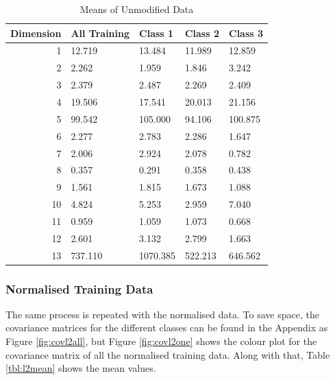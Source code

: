 \documentclass[a4paper, 10pt, conference]{ieeeconf}
\begin{document}
\begin{table}[!ht]
\centering
\caption{Means of Unmodified Data}
\label{tbl:trainingmean}
\begin{tabular}{|r|llll|}
\hline
\textbf{Dimension} & \textbf{All Training} & \textbf{Class 1} & \textbf{Class 2} & \textbf{Class 3} \\ \hline
1 & 12.719 & 13.484 & 11.989 & 12.859\\
2 & 2.262 & 1.959 & 1.846 & 3.242\\
3 & 2.379 & 2.487 & 2.269 & 2.409\\
4 & 19.506 & 17.541 & 20.013 & 21.156\\
5 & 99.542 & 105.000 & 94.106 & 100.875\\
6 & 2.277 & 2.783 & 2.286 & 1.647\\
7 & 2.006 & 2.924 & 2.078 & 0.782\\
8 & 0.357 & 0.291 & 0.358 & 0.438\\
9 & 1.561 & 1.815 & 1.673 & 1.088\\
10 & 4.824 & 5.253 & 2.959 & 7.040\\
11 & 0.959 & 1.059 & 1.073 & 0.668\\
12 & 2.601 & 3.132 & 2.799 & 1.663\\
13 & 737.110 & 1070.385 & 522.213 & 646.562\\ \hline
\end{tabular}
\end{table}

\subsubsection{Normalised Training Data}
The same process is repeated with the normalised data. To save space, the covariance matrices for the different classes can be found in the Appendix as Figure \ref{fig:covl2all}, but Figure \ref{fig:covl2one} shows the colour plot for the covariance matrix of all the normalised training data. Along with that, Table \ref{tbl:l2mean} shows the mean values.
\end{document}
